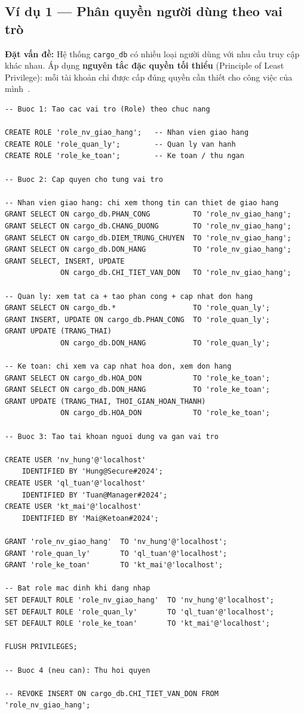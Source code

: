 \documentclass[11pt]{report}
\begin{document}
\subsection{Ví dụ 1 --- Phân quyền người dùng theo vai trò}
\label{subsec:ex_grant}

\textbf{Đặt vấn đề:} Hệ thống \texttt{cargo\_db} có nhiều loại người dùng với nhu cầu truy cập khác nhau. Áp dụng \textbf{nguyên tắc đặc quyền tối thiểu} (Principle of Least Privilege): mỗi tài khoản chỉ được cấp đúng quyền cần thiết cho công việc của mình~\cite{mysql80_security}.

\begin{verbatim}
-- Buoc 1: Tao cac vai tro (Role) theo chuc nang

CREATE ROLE 'role_nv_giao_hang';   -- Nhan vien giao hang
CREATE ROLE 'role_quan_ly';        -- Quan ly van hanh
CREATE ROLE 'role_ke_toan';        -- Ke toan / thu ngan

-- Buoc 2: Cap quyen cho tung vai tro

-- Nhan vien giao hang: chi xem thong tin can thiet de giao hang
GRANT SELECT ON cargo_db.PHAN_CONG          TO 'role_nv_giao_hang';
GRANT SELECT ON cargo_db.CHANG_DUONG        TO 'role_nv_giao_hang';
GRANT SELECT ON cargo_db.DIEM_TRUNG_CHUYEN  TO 'role_nv_giao_hang';
GRANT SELECT ON cargo_db.DON_HANG           TO 'role_nv_giao_hang';
GRANT SELECT, INSERT, UPDATE
             ON cargo_db.CHI_TIET_VAN_DON   TO 'role_nv_giao_hang';

-- Quan ly: xem tat ca + tao phan cong + cap nhat don hang
GRANT SELECT ON cargo_db.*                  TO 'role_quan_ly';
GRANT INSERT, UPDATE ON cargo_db.PHAN_CONG  TO 'role_quan_ly';
GRANT UPDATE (TRANG_THAI)
             ON cargo_db.DON_HANG           TO 'role_quan_ly';

-- Ke toan: chi xem va cap nhat hoa don, xem don hang
GRANT SELECT ON cargo_db.HOA_DON            TO 'role_ke_toan';
GRANT SELECT ON cargo_db.DON_HANG           TO 'role_ke_toan';
GRANT UPDATE (TRANG_THAI, THOI_GIAN_HOAN_THANH)
             ON cargo_db.HOA_DON            TO 'role_ke_toan';

-- Buoc 3: Tao tai khoan nguoi dung va gan vai tro

CREATE USER 'nv_hung'@'localhost'
    IDENTIFIED BY 'Hung@Secure#2024';
CREATE USER 'ql_tuan'@'localhost'
    IDENTIFIED BY 'Tuan@Manager#2024';
CREATE USER 'kt_mai'@'localhost'
    IDENTIFIED BY 'Mai@Ketoan#2024';

GRANT 'role_nv_giao_hang'  TO 'nv_hung'@'localhost';
GRANT 'role_quan_ly'       TO 'ql_tuan'@'localhost';
GRANT 'role_ke_toan'       TO 'kt_mai'@'localhost';

-- Bat role mac dinh khi dang nhap
SET DEFAULT ROLE 'role_nv_giao_hang'  TO 'nv_hung'@'localhost';
SET DEFAULT ROLE 'role_quan_ly'       TO 'ql_tuan'@'localhost';
SET DEFAULT ROLE 'role_ke_toan'       TO 'kt_mai'@'localhost';

FLUSH PRIVILEGES;

-- Buoc 4 (neu can): Thu hoi quyen

-- REVOKE INSERT ON cargo_db.CHI_TIET_VAN_DON FROM 'role_nv_giao_hang';
\end{verbatim}
\end{document}
